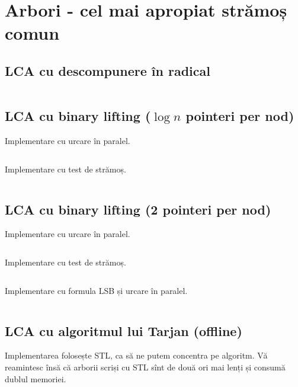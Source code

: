 \documentclass[../main.tex]{subfiles}
\begin{document}
\chapter{Arbori - cel mai apropiat strămoș comun}

\section{LCA cu descompunere în radical}
\label{code:tree-lca-sqrt}

\inputminted{cpp}{../src/trees/lca-sqrt.cpp}

\section{LCA cu binary lifting (\texorpdfstring{$\log n$}{log n} pointeri per nod)}
\label{code:tree-lca-binary-lifting}

Implementare cu urcare în paralel.

\inputminted{cpp}{../src/trees/lca-binary-lifting.cpp}

Implementare cu test de strămoș.

\inputminted{cpp}{../src/trees/lca-binary-lifting-ancestor-test.cpp}

\section{LCA cu binary lifting (2 pointeri per nod)}
\label{code:tree-lca-two-pointers}

Implementare cu urcare în paralel.

\inputminted{cpp}{../src/trees/lca-two-pointers.cpp}

Implementare cu test de strămoș.

\inputminted{cpp}{../src/trees/lca-two-pointers-ancestor-test.cpp}

Implementare cu formula LSB și urcare în paralel.

\inputminted{cpp}{../src/trees/lca-two-pointers-lsb.cpp}

\section{LCA cu algoritmul lui Tarjan (offline)}
\label{code:tree-lca-tarjan}

Implementarea folosește STL, ca să ne putem concentra pe algoritm. Vă reamintesc însă că arborii scriși cu STL sînt de două ori mai lenți și consumă dublul memoriei.
\end{document}
